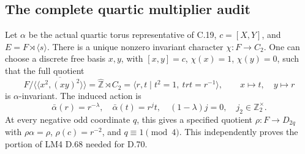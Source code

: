 \subsection{The complete quartic multiplier audit}

Let $\alpha$ be the actual quartic torus representative of
C.19, $c=[X,Y]$, and $E=F\rtimes\langle s\rangle$.
There is a unique nonzero invariant character
$\chi:F\to C_2$.  One can choose a discrete free basis
$x,y$, with $[x,y]=c$, $\chi(x)=1$, $\chi(y)=0$, such
that the full quotient
\[
 F/\overline{\langle\!\langle x^2,(xy)^2\rangle\!\rangle}
   =\widehat{\mathbb Z}\rtimes C_2
   =\langle r,t\mid t^2=1,\ trt=r^{-1}\rangle,
 \qquad x\mapsto t,\quad y\mapsto r                         \tag{C.20.1}
\]
is $\alpha$-invariant.  The induced action is
\[
 \bar\alpha(r)=r^{-\lambda},\quad
 \bar\alpha(t)=r^jt,\quad (1-\lambda)j=0,
                         \quad j_2\in\mathbb Z_2^\times.   \tag{C.20.2}
\]
At every negative odd coordinate $q$, this gives a
specified quotient $\rho:F\to D_{2q}$ with
$\rho\alpha=\rho$, $\rho(c)=r^{-2}$, and
$q\equiv1\pmod4$.  This independently proves the
portion of LM4 D.68 needed for D.70.

